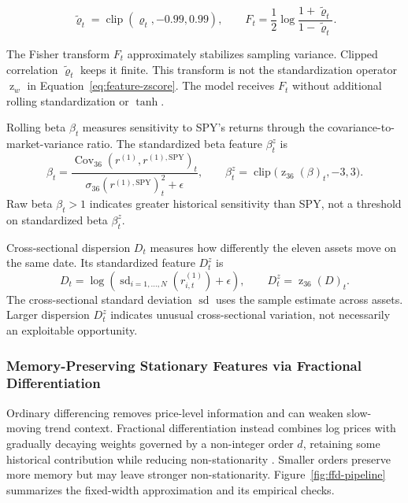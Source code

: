 \begin{equation}
\tilde\varrho_t=\operatorname{clip}(\varrho_t,-0.99,0.99),\qquad
F_t=\frac12\log\frac{1+\tilde\varrho_t}{1-\tilde\varrho_t}.
\label{eq:feature-fisher}
\end{equation}

The Fisher transform \(F_t\) approximately stabilizes sampling variance. Clipped correlation \(\tilde\varrho_t\) keeps it finite. This transform is not the standardization operator \(\operatorname z_w\) in Equation~\eqref{eq:feature-zscore}. The model receives \(F_t\) without additional rolling standardization or \(\tanh\).

Rolling beta \(\beta_t\) measures sensitivity to SPY's returns through the covariance-to-market-variance ratio. The standardized beta feature \(\beta_t^z\) is
\begin{equation}
\beta_t=\frac{\operatorname{Cov}_{36}(r^{(1)},r^{(1),\mathrm{SPY}})_t}
{\sigma_{36}(r^{(1),\mathrm{SPY}})_t^2+\epsilon},\qquad
\beta_t^z=\operatorname{clip}\big(\operatorname z_{36}(\beta)_t,-3,3\big).
\label{eq:feature-beta}
\end{equation}
Raw beta \(\beta_t>1\) indicates greater historical sensitivity than SPY, not a threshold on standardized beta \(\beta_t^z\).

Cross-sectional dispersion \(D_t\) measures how differently the eleven assets move on the same date. Its standardized feature \(D_t^z\) is
\begin{equation}
D_t=\log\!\left(\operatorname{sd}_{i=1,\dots,N}(r_{i,t}^{(1)})+\epsilon\right),\qquad
D_t^z=\operatorname z_{36}(D)_t.
\label{eq:feature-dispersion}
\end{equation}
The cross-sectional standard deviation \(\operatorname{sd}\) uses the sample estimate across assets. Larger dispersion \(D_t^z\) indicates unusual cross-sectional variation, not necessarily an exploitable opportunity.

\subsubsection{Memory-Preserving Stationary Features via Fractional Differentiation}
\label{sec:state-ffd}

Ordinary differencing removes price-level information and can weaken slow-moving trend context. Fractional differentiation instead combines log prices with gradually decaying weights governed by a non-integer order \(d\), retaining some historical contribution while reducing non-stationarity \cite{LopezdePrado.2018}. Smaller orders preserve more memory but may leave stronger non-stationarity. Figure~\ref{fig:ffd-pipeline} summarizes the fixed-width approximation and its empirical checks.

